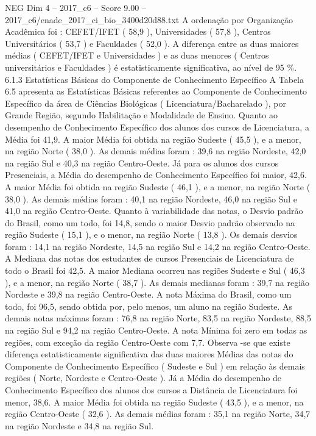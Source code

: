 \begin{textsample}{NEG Dim 4 – 2017\_c6 – Score 9.00 – 2017\_c6/enade\_2017\_ci\_bio\_3400d20d88.txt}
A ordenação por Organização Acadêmica foi : CEFET/IFET ( 58,9 ), Universidades ( 57,8 ), Centros Universitários ( 53,7 ) e Faculdades ( 52,0 ).
A diferença entre as duas maiores médias ( CEFET/IFET e Universidades ) e as duas menores ( Centros universitários e Faculdades ) é estatisticamente significativa, ao nível de 95 \%. 6.1.3 Estatísticas Básicas do Componente de Conhecimento Específico A Tabela 6.5 apresenta as Estatísticas Básicas referentes ao Componente de Conhecimento Específico da área de Ciências Biológicas ( Licenciatura/Bacharelado ), por Grande Região, segundo Habilitação e Modalidade de Ensino.
Quanto ao desempenho de Conhecimento Específico dos alunos dos cursos de Licenciatura, a Média foi 41,9.
A maior Média foi obtida na região Sudeste ( 45,5 ), e a menor, na região Norte ( 38,0 ).
As demais médias foram : 39,6 na região Nordeste, 42,0 na região Sul e 40,3 na região Centro-Oeste.
Já para os alunos dos cursos Presenciais, a Média do desempenho de Conhecimento Específico foi maior, 42,6.
A maior Média foi obtida na região Sudeste ( 46,1 ), e a menor, na região Norte ( 38,0 ).
As demais médias foram : 40,1 na região Nordeste, 46,0 na região Sul e 41,0 na região Centro-Oeste.
Quanto à variabilidade das notas, o Desvio padrão do Brasil, como um todo, foi 14,8, sendo o maior Desvio padrão observado na região Sudeste ( 15,1 ), e o menor, na região Norte ( 13,8 ).
Os demais desvios foram : 14,1 na região Nordeste, 14,5 na região Sul e 14,2 na região Centro-Oeste.
A Mediana das notas dos estudantes de cursos Presenciais de Licenciatura de todo o Brasil foi 42,5.
A maior Mediana ocorreu nas regiões Sudeste e Sul ( 46,3 ), e a menor, na região Norte ( 38,7 ).
As demais medianas foram : 39,7 na região Nordeste e 39,8 na região Centro-Oeste.
A nota Máxima do Brasil, como um todo, foi 96,5, sendo obtida por, pelo menos, um aluno na região Sudeste.
As demais notas máximas foram : 76,8 na região Norte, 83,5 na região Nordeste, 88,5 na região Sul e 94,2 na região Centro-Oeste.
A nota Mínima foi zero em todas as regiões, com exceção da região Centro-Oeste com 7,7.
Observa -se que existe diferença estatisticamente significativa das duas maiores Médias das notas do Componente de Conhecimento Específico ( Sudeste e Sul ) em relação às demais regiões ( Norte, Nordeste e Centro-Oeste ).
Já a Média do desempenho de Conhecimento Específico dos alunos dos cursos a Distância de Licenciatura foi menor, 38,6.
A maior Média foi obtida na região Sudeste ( 43,5 ), e a menor, na região Centro-Oeste ( 32,6 ).
As demais médias foram : 35,1 na região Norte, 34,7 na região Nordeste e 34,8 na região Sul.

\end{textsample}
